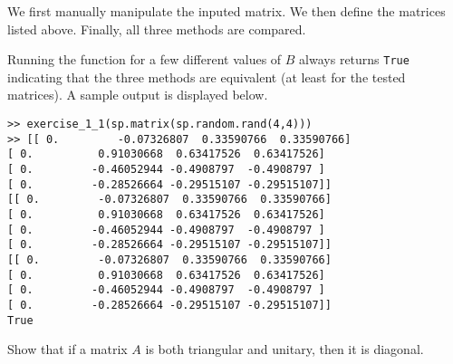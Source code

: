 \documentclass[10pt]{article}
\begin{document}
\begin{solution}[Solution]
We first manually manipulate the inputed matrix. We then define the matrices listed above. Finally, all three methods are compared. 


Running the function for a few different values of \( B \) always returns \verb|True| indicating that the three methods are equivalent (at least for the tested matrices). A sample output is displayed below.
\begin{lstlisting}
>> exercise_1_1(sp.matrix(sp.random.rand(4,4)))
>> [[ 0.         -0.07326807  0.33590766  0.33590766]
[ 0.          0.91030668  0.63417526  0.63417526]
[ 0.         -0.46052944 -0.4908797  -0.4908797 ]
[ 0.         -0.28526664 -0.29515107 -0.29515107]]
[[ 0.         -0.07326807  0.33590766  0.33590766]
[ 0.          0.91030668  0.63417526  0.63417526]
[ 0.         -0.46052944 -0.4908797  -0.4908797 ]
[ 0.         -0.28526664 -0.29515107 -0.29515107]]
[[ 0.         -0.07326807  0.33590766  0.33590766]
[ 0.          0.91030668  0.63417526  0.63417526]
[ 0.         -0.46052944 -0.4908797  -0.4908797 ]
[ 0.         -0.28526664 -0.29515107 -0.29515107]]
True
\end{lstlisting}
\end{solution}
	
\begin{problem}[Exercise 2.1]
Show that if a matrix \( A \) is both triangular and unitary, then it is diagonal.
\end{problem}
\end{document}
